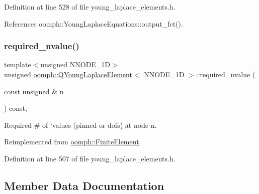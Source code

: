 Definition at line 528 of file young\+\_\+laplace\+\_\+elements.\+h.



References oomph\+::\+Young\+Laplace\+Equations\+::output\+\_\+fct().

\mbox{\label{classoomph_1_1QYoungLaplaceElement_ab7ff7b786f99d3844d795b61ee7cf852}} 
\subsubsection{\texorpdfstring{required\+\_\+nvalue()}{required\_nvalue()}}
{\footnotesize\ttfamily template$<$unsigned N\+N\+O\+D\+E\+\_\+1D$>$ \\
unsigned \hyperlink{classoomph_1_1QYoungLaplaceElement}{oomph\+::\+Q\+Young\+Laplace\+Element}$<$ N\+N\+O\+D\+E\+\_\+1D $>$\+::required\+\_\+nvalue (\begin{DoxyParamCaption}\item[{const unsigned \&}]{n }\end{DoxyParamCaption}) const\hspace{0.3cm}{\ttfamily [inline]}, {\ttfamily [virtual]}}



Required \# of `values\textquotesingle{} (pinned or dofs) at node n. 



Reimplemented from \hyperlink{classoomph_1_1FiniteElement_a56610c60d5bc2d7c27407a1455471b1a}{oomph\+::\+Finite\+Element}.



Definition at line 507 of file young\+\_\+laplace\+\_\+elements.\+h.



\subsection{Member Data Documentation}
\mbox{\label{classoomph_1_1QYoungLaplaceElement_a88a7038a816787a6626bca44e82ad40d}} 
